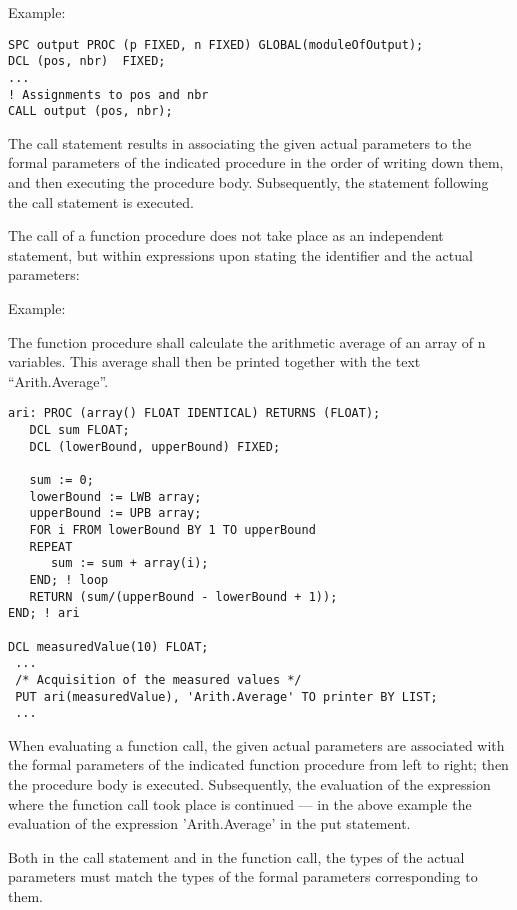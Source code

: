 Example:

\begin{lstlisting}
SPC output PROC (p FIXED, n FIXED) GLOBAL(moduleOfOutput);
DCL (pos, nbr)  FIXED;
...
! Assignments to pos and nbr
CALL output (pos, nbr);
\end{lstlisting}

The call statement results in associating the given actual parameters
to the formal parameters of the indicated procedure in the order of
writing down them, and then executing the procedure body. Subsequently,
the statement following the call statement is executed.

The call of a function procedure does not take place as an independent
statement, but within expressions upon stating the identifier and the
actual parameters:

\begin{grammarframe}

\end{grammarframe}

Example:

The function procedure  shall calculate the arithmetic average of an
array of n  variables. This average shall then be printed together
with the text ``Arith.Average''.

\begin{lstlisting}
ari: PROC (array() FLOAT IDENTICAL) RETURNS (FLOAT);
   DCL sum FLOAT;
   DCL (lowerBound, upperBound) FIXED;

   sum := 0;
   lowerBound := LWB array; 
   upperBound := UPB array; 
   FOR i FROM lowerBound BY 1 TO upperBound
   REPEAT
      sum := sum + array(i);
   END; ! loop
   RETURN (sum/(upperBound - lowerBound + 1));
END; ! ari

DCL measuredValue(10) FLOAT;
 ...
 /* Acquisition of the measured values */ 
 PUT ari(measuredValue), 'Arith.Average' TO printer BY LIST;
 ...
\end{lstlisting}

When evaluating a function call, the given actual parameters are
associated with the formal parameters of the indicated function
procedure 
from left to right;
 then the procedure body is
executed. Subsequently, the evaluation of the expression where the
function call took place is continued --- in the above example the
evaluation of the expression 'Arith.Average' in the put statement.

Both in the call statement and in the function call, the types of the
actual parameters must match the types of the formal parameters
corresponding to them.

